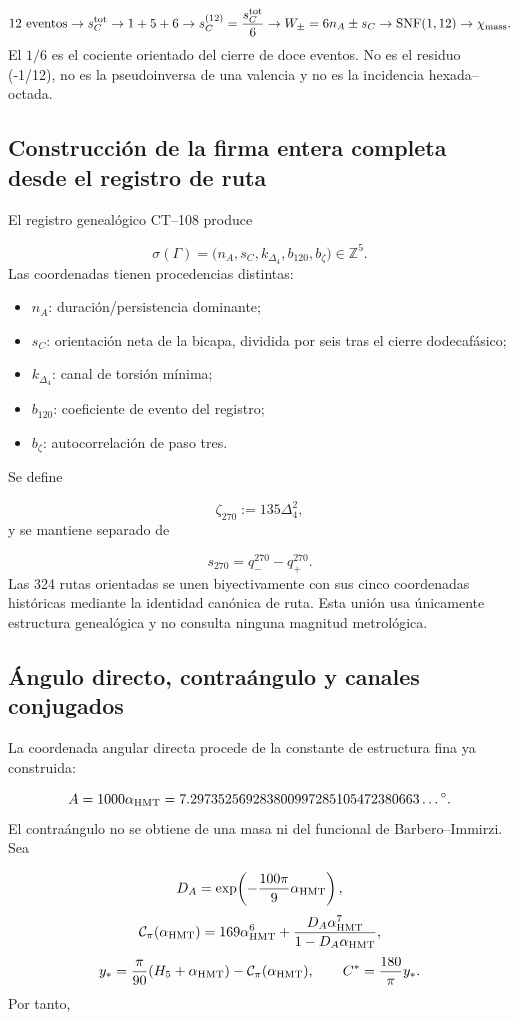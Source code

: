 \[
12\ \text{eventos}
\to s_C^{\rm tot}
\to 1+5+6
\to s_C^{(12)}=\frac{s_C^{\rm tot}}6
\to W_\pm=6n_A\pm s_C
\to\operatorname{SNF}(1,12)
\to\chi_{\rm mass}.
\]
El \(1/6\) es el cociente orientado del cierre de doce eventos. No es el residuo (-1/12), no es la pseudoinversa de una valencia y no es la incidencia hexada--octada.

\subsection{Construcción de la firma entera completa desde el registro de ruta}
El registro genealógico CT--108 produce

\[
 \sigma(\Gamma)
 =\bigl(n_A,s_C,k_{\Delta_4},b_{120},b_\zeta\bigr)\in\mathbb Z^5.
\]
Las coordenadas tienen procedencias distintas:

\begin{itemize}
\item \(n_A\): duración/persistencia dominante;
\item \(s_C\): orientación neta de la bicapa, dividida por seis tras el cierre
dodecafásico;

\item \(k_{\Delta_4}\): canal de torsión mínima;
\item \(b_{120}\): coeficiente de evento del registro;
\item \(b_\zeta\): autocorrelación de paso tres.
\end{itemize}
Se define

\[
 \zeta_{270}:=135\Delta_4^2,
\]
y se mantiene separado de

\[
 s_{270}=q_-^{270}-q_+^{270}.
\]
Las 324 rutas orientadas se unen biyectivamente con sus cinco coordenadas históricas mediante la identidad canónica de ruta. Esta unión usa únicamente estructura genealógica y no consulta ninguna magnitud metrológica.

\subsection{Ángulo directo, contraángulo y canales conjugados}
La coordenada angular directa procede de la constante de estructura fina ya construida:

\[
 A=1000\alpha_{\rm HMT}
 =7.297352569283800997285105472380663\ldots{}^\circ.
\]
El contraángulo no se obtiene de una masa ni del funcional de Barbero--Immirzi. Sea

\[
 D_A=\exp\!\left(-\frac{100\pi}{9}\alpha_{\rm HMT}\right),
\]
\[
 \mathcal C_\pi(\alpha_{\rm HMT})
 =169\alpha_{\rm HMT}^{6}
 +\frac{D_A\alpha_{\rm HMT}^{7}}
        {1-D_A\alpha_{\rm HMT}},
\]
\[
 y_*=\frac{\pi}{90}(H_5+\alpha_{\rm HMT})
      -\mathcal C_\pi(\alpha_{\rm HMT}),
 \qquad
 C^*=\frac{180}{\pi}y_*.
\]
Por tanto,

